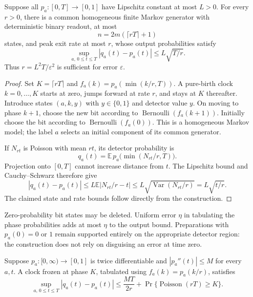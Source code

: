\begin{theorem}
\label{rf:poisson-realization}
Suppose all $p_a:[0,T]\to[0,1]$ have Lipschitz constant at most $L>0$.
For every $r>0$, there is a common homogeneous finite Markov generator with
deterministic binary readout, at most
\[
 n=2m(\lceil rT\rceil+1)
\]
states, and peak exit rate at most $r$, whose output probabilities satisfy
\begin{equation}
 \sup_{a,\,0\le t\le T}|q_a(t)-p_a(t)|
 \le L\sqrt{T/r}.
 \label{rf:lipschitz-realization}
\end{equation}
Thus $r=L^2T/\varepsilon^2$ is sufficient for error $\varepsilon$.
\end{theorem}

\begin{proof}
Set $K=\lceil rT\rceil$ and $f_a(k)=p_a(\min(k/r,T))$. A pure-birth clock
$k=0,\ldots,K$ starts at zero, jumps forward at rate $r$, and stays at $K$
thereafter. Introduce states $(a,k,y)$ with $y\in\{0,1\}$ and detector value
$y$. On moving to phase $k+1$, choose the new bit according to
$\operatorname{Bernoulli}(f_a(k+1))$. Initially choose the bit according to
$\operatorname{Bernoulli}(f_a(0))$. This is a homogeneous Markov model; the
label $a$ selects an initial component of its common generator.

If $N_{rt}$ is Poisson with mean $rt$, its detector probability is
\[
 q_a(t)=\mathbb E\,p_a\bigl(\min(N_{rt}/r,T)\bigr).
\]
Projection onto $[0,T]$ cannot increase distance from $t$. The Lipschitz
bound and Cauchy--Schwarz therefore give
\[
 |q_a(t)-p_a(t)|\le L\mathbb E|N_{rt}/r-t|
 \le L\sqrt{\operatorname{Var}(N_{rt}/r)}
 =L\sqrt{t/r}.
\]
The claimed state and rate bounds follow directly from the construction.
\end{proof}

Zero-probability bit states may be deleted. Uniform error $\eta$ in tabulating
the phase probabilities adds at most $\eta$ to the output bound. Preparations
with $p_a(0)=0$ or $1$ remain supported entirely on the appropriate detector
region: the construction does not rely on disguising an error at time zero.

\begin{proposition}
\label{rf:smooth-realization}
Suppose $p_a:[0,\infty)\to[0,1]$ is twice differentiable and
$|p_a''(t)|\le M$ for every $a,t$. A clock frozen at phase $K$, tabulated using
$f_a(k)=p_a(k/r)$, satisfies
\begin{equation}
 \sup_{a,\,0\le t\le T}|q_a(t)-p_a(t)|
 \le \frac{MT}{2r}+\Pr\{\operatorname{Poisson}(rT)\ge K\}.
 \label{rf:smooth-clock-bound}
\end{equation}
\end{proposition}

